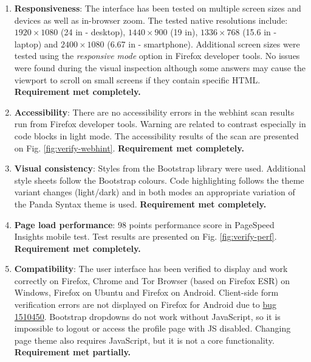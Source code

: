 \begin{enumerate}
	\item \textbf{Responsiveness}: The interface has been tested on multiple screen sizes and devices as well as in-browser zoom. The tested native resolutions include: $1920 \times 1080$ (24 in - desktop), $1440 \times 900$ (19 in), $1336 \times 768$ (15.6 in - laptop) and $2400 \times 1080$ (6.67 in - smartphone). Additional screen sizes were tested using the \textit{responsive mode} option in Firefox developer tools. No issues were found during the visual inspection although some answers may cause the viewport to scroll on small screens if they contain specific HTML. \textbf{Requirement met completely.}

	\item \textbf{Accessibility}: There are no accessibility errors in the webhint scan results run from Firefox developer tools. Warning are related to contrast especially in code blocks in light mode. The accessibility results of the scan are presented on Fig. \ref{fig:verify-webhint}. \textbf{Requirement met completely.}

	\item \textbf{Visual consistency}: Styles from the Bootstrap library were used. Additional style sheets follow the Bootstrap colours. Code highlighting follows the theme variant changes (light/dark) and in both modes an appropriate variation of the Panda Syntax theme is used. \textbf{Requirement met completely.}

	\item \textbf{Page load performance}: 98 points performance score in PageSpeed Insights mobile test. Test results are presented on Fig. \ref{fig:verify-perf}. \textbf{Requirement met completely.}

	\item \textbf{Compatibility}: The user interface has been verified to display and work correctly on Firefox, Chrome and Tor Browser (based on Firefox ESR) on Windows, Firefox on Ubuntu and Firefox on Android. Client-side form verification errors are not displayed on Firefox for Android due to \href{https://bugzilla.mozilla.org/show_bug.cgi?id=1510450}{bug 1510450}. Bootstrap dropdowns do not work without JavaScript, so it is impossible to logout or access the profile page with JS disabled. Changing page theme also requires JavaScript, but it is not a core functionality. \textbf{Requirement met partially.}
\end{enumerate}

